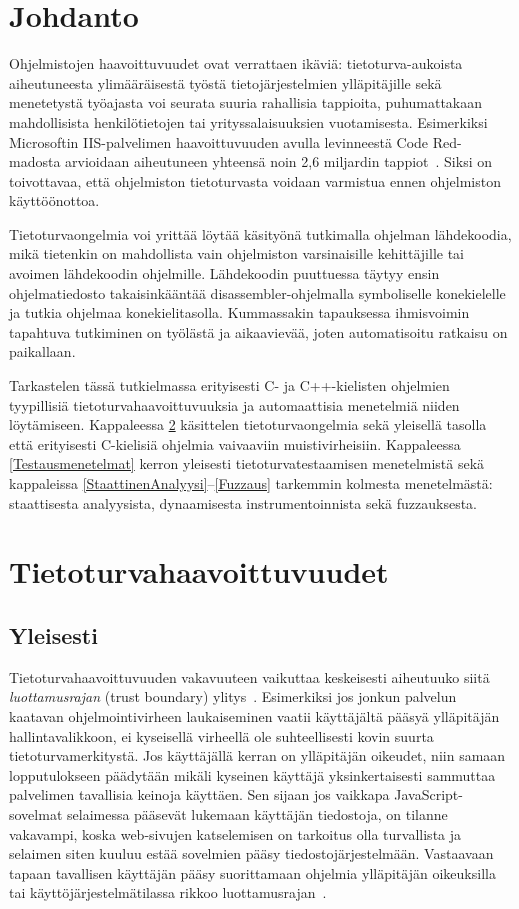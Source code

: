 \section{Johdanto}

Ohjelmistojen haavoittuvuudet ovat verrattaen ikäviä:
tietoturva-aukoista aiheutuneesta ylimääräisestä työstä tietojärjestelmien ylläpitäjille
sekä menetetystä työajasta voi seurata suuria rahallisia tappioita,
puhumattakaan mahdollisista henkilötietojen tai yrityssalaisuuksien vuotamisesta.
Esimerkiksi Microsoftin IIS-palvelimen haavoittuvuuden avulla levinneestä Code Red-madosta
arvioidaan aiheutuneen yhteensä noin 2,6 miljardin tappiot~\cite{CodeRed}.
Siksi on toivottavaa, että ohjelmiston tietoturvasta voidaan varmistua ennen ohjelmiston käyttöönottoa.

Tietoturvaongelmia voi yrittää löytää käsityönä tutkimalla ohjelman lähdekoodia,
mikä tietenkin on mahdollista vain ohjelmiston varsinaisille kehittäjille
tai avoimen lähdekoodin ohjelmille.
Lähdekoodin puuttuessa täytyy ensin ohjelmatiedosto takaisinkääntää
disassembler-ohjelmalla symboliselle konekielelle
ja tutkia ohjelmaa konekielitasolla.
Kummassakin tapauksessa ihmisvoimin tapahtuva tutkiminen on työlästä ja aikaavievää, joten automatisoitu ratkaisu on paikallaan.

Tarkastelen tässä tutkielmassa erityisesti C- ja C++-kielisten ohjelmien tyypillisiä tietoturvahaavoittuvuuksia
ja automaattisia menetelmiä niiden löytämiseen.
Kappaleessa \ref{YleinenTietoturva} käsittelen tietoturvaongelmia sekä yleisellä tasolla
että erityisesti C-kielisiä ohjelmia vaivaaviin muistivirheisiin.
Kappaleessa \ref{Testausmenetelmat} kerron yleisesti tietoturvatestaamisen menetelmistä
sekä kappaleissa \ref{StaattinenAnalyysi}--\ref{Fuzzaus}
tarkemmin kolmesta menetelmästä: staattisesta analyysista, dynaamisesta instrumentoinnista sekä fuzzauksesta.

\section{Tietoturvahaavoittuvuudet}
\label{YleinenTietoturva}
\subsection{Yleisesti}
Tietoturvahaavoittuvuuden vakavuuteen vaikuttaa keskeisesti aiheutuuko siitä \emph{luottamusrajan}
(trust boundary) ylitys~\cite{ViolatingAssumptions}.
Esimerkiksi jos jonkun palvelun kaatavan ohjelmointivirheen laukaiseminen vaatii käyttäjältä pääsyä
ylläpitäjän hallintavalikkoon, ei kyseisellä virheellä ole suhteellisesti kovin suurta tietoturvamerkitystä.
Jos käyttäjällä kerran on ylläpitäjän oikeudet, niin samaan lopputulokseen päädytään mikäli kyseinen
käyttäjä yksinkertaisesti sammuttaa palvelimen tavallisia keinoja käyttäen.
Sen sijaan jos vaikkapa JavaScript-sovelmat selaimessa pääsevät lukemaan käyttäjän tiedostoja,
on tilanne vakavampi,
koska web-sivujen katselemisen on tarkoitus olla turvallista ja selaimen siten
kuuluu estää sovelmien pääsy tiedostojärjestelmään.
Vastaavaan tapaan tavallisen käyttäjän pääsy suorittamaan ohjelmia ylläpitäjän oikeuksilla
tai käyttöjärjestelmätilassa rikkoo luottamusrajan~\cite{ViolatingAssumptions}.

